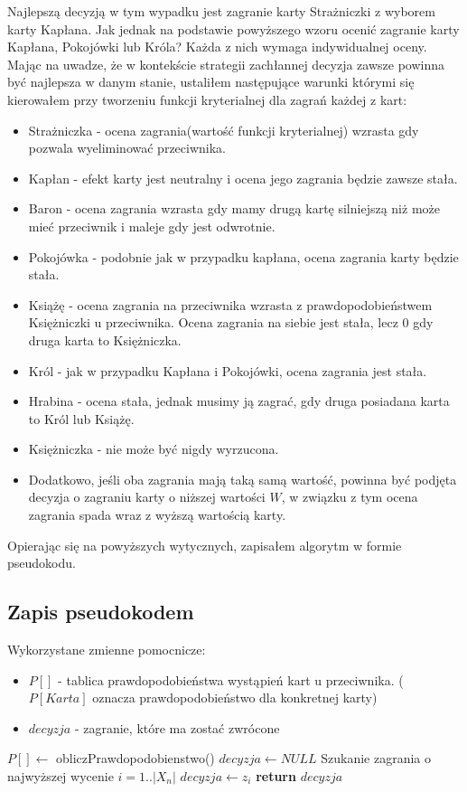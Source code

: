 Najlepszą decyzją w tym wypadku jest zagranie karty Strażniczki z wyborem karty Kapłana. Jak jednak na podstawie powyższego wzoru ocenić zagranie karty Kapłana, Pokojówki lub Króla? Każda z nich wymaga indywidualnej oceny. Mając na uwadze, że w kontekście strategii zachłannej decyzja zawsze powinna być najlepsza w danym stanie, ustaliłem następujące warunki którymi się kierowałem przy tworzeniu funkcji kryterialnej dla zagrań każdej z kart:
\begin{itemize}
	\item Strażniczka - ocena zagrania(wartość funkcji kryterialnej) wzrasta gdy pozwala wyeliminować przeciwnika.
	\item Kapłan - efekt karty jest neutralny i ocena jego zagrania będzie zawsze stała.
	\item Baron - ocena zagrania wzrasta gdy mamy drugą kartę silniejszą niż może mieć przeciwnik i maleje gdy jest odwrotnie.
	\item Pokojówka - podobnie jak w przypadku kapłana, ocena zagrania karty będzie stała.
	\item Książę - ocena zagrania na przeciwnika wzrasta z prawdopodobieństwem Księżniczki u przeciwnika. Ocena zagrania na siebie jest stała, lecz 0 gdy druga karta to Księżniczka.
	\item Król - jak w przypadku Kapłana i Pokojówki, ocena zagrania jest stała.
	\item Hrabina - ocena stała, jednak musimy ją zagrać, gdy druga posiadana karta to Król lub Książę.
	\item Księżniczka - nie może być nigdy wyrzucona.
	\item Dodatkowo, jeśli oba zagrania mają taką samą wartość, powinna być podjęta decyzja o zagraniu karty o niższej wartości $W$, w związku z tym ocena zagrania spada wraz z wyższą wartością karty.
\end{itemize}
Opierając się na powyższych wytycznych, zapisałem algorytm w formie pseudokodu.
\subsection{Zapis pseudokodem}
Wykorzystane zmienne pomocnicze:
\begin{itemize}
	\item $P[]$ - tablica prawdopodobieństwa wystąpień kart u przeciwnika. ($P[Karta]$ oznacza prawdopodobieństwo dla konkretnej karty)
	\item $decyzja$ - zagranie, które ma zostać zwrócone
\end{itemize}
\begin{algorithmic}[1]
		\State $P[] \gets$ obliczPrawdopodobienstwo()
		\State $ decyzja \gets NULL$ \Comment Szukanie zagrania o najwyższej wycenie
		 \Comment $i=1..|X_n|$
					\State $decyzja \gets z_i$
				\EndIf
		\EndFor		
		\State \textbf{return} $decyzja$
	\EndFunction
\end{algorithmic}

